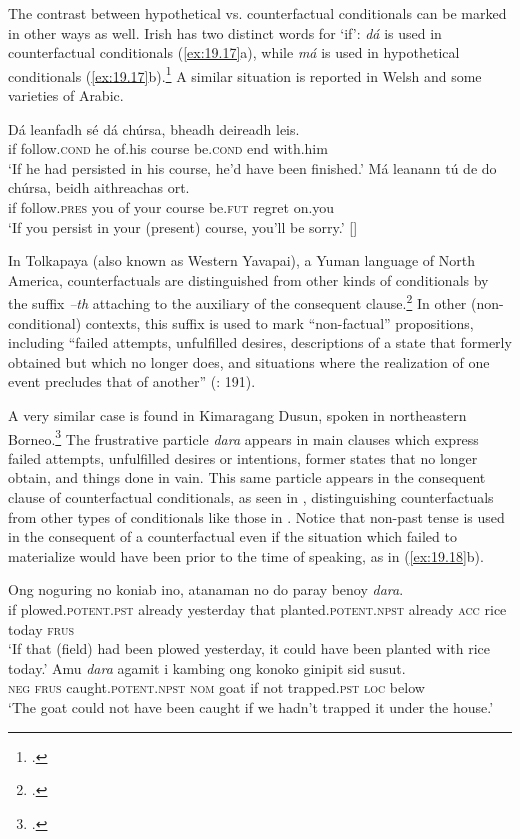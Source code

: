 The contrast between hypothetical vs. counterfactual conditionals can be marked in other ways as well. Irish has two distinct words for ‘if’: \textit{dá} is used in counterfactual conditionals (\ref{ex:19.17}a), while \textit{má} is used in hypothetical conditionals (\ref{ex:19.17}b).\footnote{\citet{McCloskey2001}.} A similar situation is reported in Welsh and some varieties of Arabic.


\ea \label{ex:19.17}
\ea   \gll Dá  leanfadh  sé  dá  chúrsa,  bheadh  deireadh  leis.\\
if  follow.\textsc{cond}  he  of.his  course  be.\textsc{cond}  end  with.him\\
\glt ‘If he had persisted in his course, he’d have been finished.’
\ex \gll  Má  leanann  tú  de  do  chúrsa,  beidh  aithreachas  ort.\\
if  follow.\textsc{pres}  you  of  your  course  be.\textsc{fut}  regret  on.you\\
\glt ‘If you persist in your (present) course, you’ll be sorry.’  [\citealt{McCloskey2001}]
\z \z


In Tolkapaya (also known as Western Yavapai), a Yuman language of North America, counterfactuals are distinguished from other kinds of conditionals by the suffix \textit{–th} attaching to the auxiliary of the consequent clause.\footnote{\citet{HardyGordon1980}.} In other (non-conditional) contexts, this suffix is used to mark “non-factual” propositions, including “failed attempts, unfulfilled desires, descriptions of a state that formerly obtained but which no longer does, and situations where the realization of one event precludes that of another” (\citealt{HardyGordon1980}: 191).



A very similar case is found in Kimaragang Dusun, spoken in northeastern Borneo.\footnote{\citet{Kroeger2017}.} The frustrative particle \textit{dara} appears in main clauses which express failed attempts, unfulfilled desires or intentions, former states that no longer obtain, and things done in vain. This same particle appears in the consequent clause of counterfactual conditionals, as seen in , distinguishing counterfactuals from other types of conditionals like those in . Notice that non-past tense is used in the consequent of a counterfactual even if the situation which failed to materialize would have been prior to the time of speaking, as in (\ref{ex:19.18}b).


\ea \label{ex:19.18}
\ea  \gll  Ong  noguring  no  koniab  ino,  atanaman  no   do  paray  benoy  \textit{dara}.\\
if  plowed.\textsc{potent.pst}  already  yesterday  that  planted.\textsc{potent.npst}  already \textsc{acc}  rice  today  \textsc{frus}\\
\glt ‘If that (field) had been plowed yesterday, it could have been planted with rice today.’
\ex \gll  Amu  \textit{dara}  agamit  i  kambing  ong  konoko  ginipit  sid  susut.\\
\textsc{neg}  \textsc{frus}  caught.\textsc{potent.npst}  \textsc{nom}  goat  if  not  trapped\textsc{.pst  loc}  below\\
\glt ‘The goat could not have been caught if we hadn’t trapped it under the house.’
\z \z

